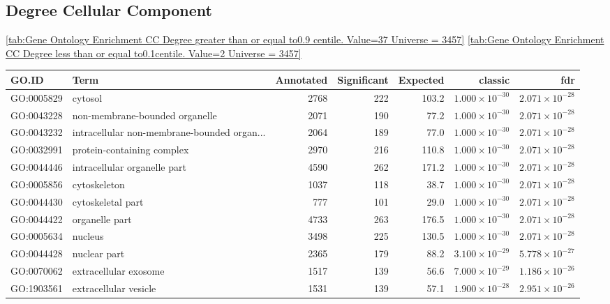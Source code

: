 \subsection{Degree Cellular Component}
    \ref{tab:Gene Ontology Enrichment CC Degree  greater than or equal to0.9 centile.   Value=37 Universe = 3457}
    \ref{tab:Gene Ontology Enrichment CC Degree  less than or equal to0.1centile.   Value=2 Universe = 3457}
\begin{table}[ht]
\centering
\begin{adjustbox}{max width=\textwidth}
\begin{tabular}{llrrrrr}
  \hline
GO.ID & Term & Annotated & Significant & Expected & classic & fdr \\ 
  \hline
GO:0005829 & cytosol & 2768 & 222 & 103.2 & $1.000 \times 10^{-30}$ & $2.071 \times 10^{-28}$ \\ 
  GO:0043228 & non-membrane-bounded organelle & 2071 & 190 & 77.2 & $1.000 \times 10^{-30}$ & $2.071 \times 10^{-28}$ \\ 
  GO:0043232 & intracellular non-membrane-bounded organ... & 2064 & 189 & 77.0 & $1.000 \times 10^{-30}$ & $2.071 \times 10^{-28}$ \\ 
  GO:0032991 & protein-containing complex & 2970 & 216 & 110.8 & $1.000 \times 10^{-30}$ & $2.071 \times 10^{-28}$ \\ 
  GO:0044446 & intracellular organelle part & 4590 & 262 & 171.2 & $1.000 \times 10^{-30}$ & $2.071 \times 10^{-28}$ \\ 
  GO:0005856 & cytoskeleton & 1037 & 118 & 38.7 & $1.000 \times 10^{-30}$ & $2.071 \times 10^{-28}$ \\ 
  GO:0044430 & cytoskeletal part & 777 & 101 & 29.0 & $1.000 \times 10^{-30}$ & $2.071 \times 10^{-28}$ \\ 
  GO:0044422 & organelle part & 4733 & 263 & 176.5 & $1.000 \times 10^{-30}$ & $2.071 \times 10^{-28}$ \\ 
  GO:0005634 & nucleus & 3498 & 225 & 130.5 & $1.000 \times 10^{-30}$ & $2.071 \times 10^{-28}$ \\ 
  GO:0044428 & nuclear part & 2365 & 179 & 88.2 & $3.100 \times 10^{-29}$ & $5.778 \times 10^{-27}$ \\ 
  GO:0070062 & extracellular exosome & 1517 & 139 & 56.6 & $7.000 \times 10^{-29}$ & $1.186 \times 10^{-26}$ \\ 
  GO:1903561 & extracellular vesicle & 1531 & 139 & 57.1 & $1.900 \times 10^{-28}$ & $2.951 \times 10^{-26}$ \\ 

\end{tabular}
\end{adjustbox}
\end{table}

